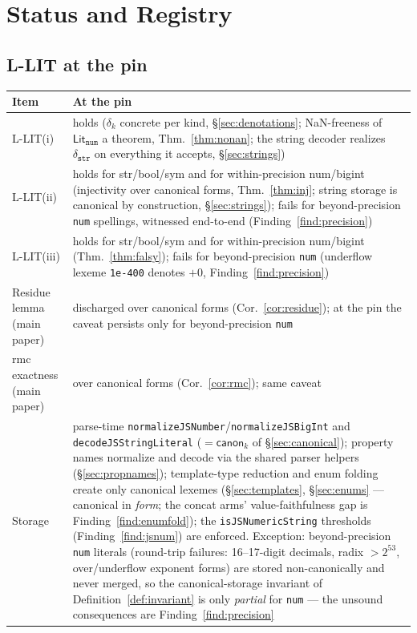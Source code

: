 \documentclass[11pt]{article}
\newcommand{\Lit}[1]{\mathsf{Lit}_{\texttt{#1}}}
\newcommand{\canon}{\mathsf{canon}}
\begin{document}
\section{Status and Registry}
\label{sec:status}

\subsection{L-LIT at the pin}

\begingroup
\renewcommand{\arraystretch}{1.25}
\small
\begin{longtable}{@{}p{2.4cm}p{11.0cm}@{}}
\toprule
\textbf{Item} & \textbf{At the pin} \\
\midrule
\endhead
L-LIT(i) & holds ($\delta_k$ concrete per kind,
  \S\ref{sec:denotations}; NaN-freeness of $\Lit{num}$ a theorem,
  Thm.~\ref{thm:nonan}; the string decoder realizes
  $\delta_{\texttt{str}}$ on everything it accepts,
  \S\ref{sec:strings}) \\
L-LIT(ii) & holds for str/bool/sym and for within-precision num/bigint
  (injectivity over canonical forms, Thm.~\ref{thm:inj}; string storage
  is canonical by construction, \S\ref{sec:strings}); fails for
  beyond-precision \texttt{num} spellings, witnessed end-to-end
  (Finding~\ref{find:precision}) \\
L-LIT(iii) & holds for str/bool/sym and for within-precision num/bigint
  (Thm.~\ref{thm:falsy}); fails for beyond-precision \texttt{num}
  (underflow lexeme \texttt{1e-400} denotes $+0$,
  Finding~\ref{find:precision}) \\
Residue lemma (main paper) & discharged over canonical forms
  (Cor.~\ref{cor:residue}); at the pin the caveat persists only for
  beyond-precision \texttt{num} \\
rmc exactness (main paper) & over canonical forms (Cor.~\ref{cor:rmc});
  same caveat \\
Storage & parse-time \texttt{normalizeJSNumber}/\texttt{normalizeJSBigInt}
  and \texttt{decodeJSStringLiteral}
  ($= \canon_k$ of \S\ref{sec:canonical}); property names normalize and
  decode via the shared parser helpers (\S\ref{sec:propnames});
  template-type reduction and enum folding create only canonical lexemes
  (\S\ref{sec:templates}, \S\ref{sec:enums} --- canonical in \emph{form};
  the concat arms' value-faithfulness gap is
  Finding~\ref{find:enumfold}); the
  \texttt{isJSNumericString} thresholds (Finding~\ref{find:jsnum}) are
  enforced. Exception: beyond-precision \texttt{num} literals
  (round-trip failures: 16--17-digit decimals, radix $>2^{53}$,
  over/underflow exponent forms) are stored non-canonically and never
  merged, so the canonical-storage invariant of
  Definition~\ref{def:invariant} is only \emph{partial} for
  \texttt{num} --- the unsound consequences are
  Finding~\ref{find:precision} \\
\bottomrule
\end{longtable}
\endgroup
\end{document}
